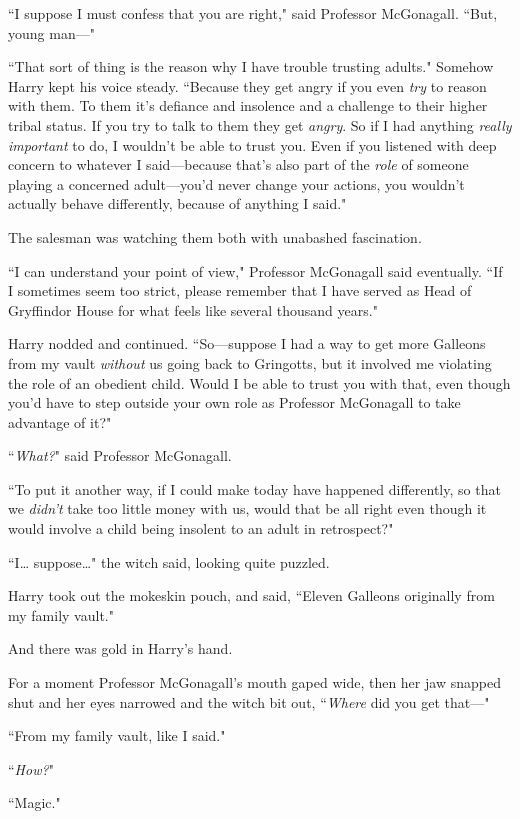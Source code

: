 ``I suppose I must confess that you are right," said Professor McGonagall. ``But, young man—"

``That sort of thing is the reason why I have trouble trusting adults." Somehow Harry kept his voice steady. ``Because they get angry if you even \emph{try} to reason with them. To them it's defiance and insolence and a challenge to their higher tribal status. If you try to talk to them they get \emph{angry}. So if I had anything \emph{really important} to do, I wouldn't be able to trust you. Even if you listened with deep concern to whatever I said—because that's also part of the \emph{role} of someone playing a concerned adult—you'd never change your actions, you wouldn't actually behave differently, because of anything I said."

The salesman was watching them both with unabashed fascination.

``I can understand your point of view," Professor McGonagall said eventually. ``If I sometimes seem too strict, please remember that I have served as Head of Gryffindor House for what feels like several thousand years."

Harry nodded and continued. ``So—suppose I had a way to get more Galleons from my vault \emph{without} us going back to Gringotts, but it involved me violating the role of an obedient child. Would I be able to trust you with that, even though you'd have to step outside your own role as Professor McGonagall to take advantage of it?"

``\emph{What?}" said Professor McGonagall.

``To put it another way, if I could make today have happened differently, so that we \emph{didn't} take too little money with us, would that be all right even though it would involve a child being insolent to an adult in retrospect?"

``I{\ldots} suppose{\ldots}" the witch said, looking quite puzzled.

Harry took out the mokeskin pouch, and said, ``Eleven Galleons originally from my family vault."

And there was gold in Harry's hand.

For a moment Professor McGonagall's mouth gaped wide, then her jaw snapped shut and her eyes narrowed and the witch bit out, ``\emph{Where} did you get that—"

``From my family vault, like I said."

``\emph{How?}"

``Magic."

